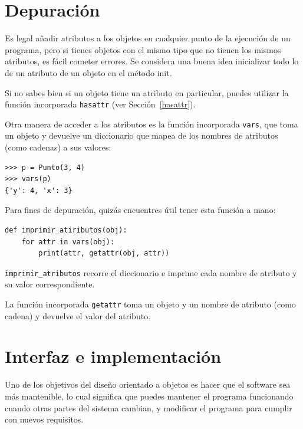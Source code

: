 \documentclass[10pt]{book}
\begin{document}
\section{Depuración}

Es legal añadir atributos a los objetos en cualquier punto de la ejecución
de un programa, pero si tienes objetos con el mismo tipo que no
tienen los mismos atributos, es fácil cometer errores.
Se considera una buena idea
inicializar todo lo de un atributo de un objeto en el método init.

Si no sabes bien si un objeto tiene un atributo en particular,
puedes utilizar la función incorporada {\tt hasattr} (ver Sección~\ref{hasattr}).

Otra manera de acceder a los atributos es la función incorporada {\tt vars},
que toma un objeto y devuelve un diccionario que mapea de los nombres
de atributos (como cadenas) a sus valores:

\begin{verbatim}
>>> p = Punto(3, 4)
>>> vars(p)
{'y': 4, 'x': 3}
\end{verbatim}
%
Para fines de depuración, quizás encuentres útil tener esta
función a mano:

\begin{verbatim}
def imprimir_atiributos(obj):
    for attr in vars(obj):
        print(attr, getattr(obj, attr))
\end{verbatim}
%
\verb"imprimir_atributos" recorre el diccionario
e imprime cada nombre de atributo y su valor correspondiente.

La función incorporada {\tt getattr} toma un objeto y un nombre
de atributo (como cadena) y devuelve el valor del atributo.


\section{Interfaz e implementación}

Uno de los objetivos del diseño orientado a objetos es hacer que el software sea más
mantenible, lo cual significa que puedes mantener el programa funcionando cuando
otras partes del sistema cambian, y modificar el programa para cumplir con nuevos
requisitos.
\end{document}

